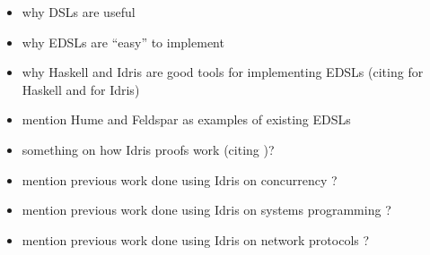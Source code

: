 \begin{itemize}
	\item why DSLs are useful \cite{685738,hudak1996building}
	\item why EDSLs are ``easy'' to implement \cite{685738}
	\item why Haskell and Idris are good tools for implementing EDSLs (citing
    	  \cite{10.1007/3-540-45350-4_5,685738,hudak1996building} for Haskell and
    	  \cite{brady2015embedded} for Idris)
	\item mention Hume \cite{10.1007/978-3-540-39815-8_3} and Feldspar
  		  \cite{5558637} as examples of existing EDSLs
	\item something on how Idris proofs work (citing \cite{brady2015embedded})?
	\item mention previous work done using Idris on concurrency
		  \cite{brady2010correct}?
	\item mention previous work done using Idris on systems programming
		  \cite{10.1007/978-3-642-27694-1_18,Brady:2011:ISP:1929529.1929536}?
	\item mention previous work done using Idris on network protocols
		  \cite{5158855}?
\end{itemize}